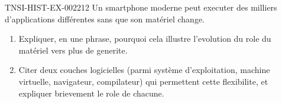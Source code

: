 \begin{exercice}{TNSI-HIST-EX-002}{2}{12}
Un smartphone moderne peut executer des milliers d'applications différentes sans que son matériel change.
\begin{enumerate}
  \item Expliquer, en une phrase, pourquoi cela illustre l'evolution du role du matériel vers plus de generite.
  \item Citer deux couches logicielles (parmi système d'exploitation, machine virtuelle, navigateur, compilateur) qui permettent cette flexibilite, et expliquer brievement le role de chacune.
\end{enumerate}
\end{exercice}
